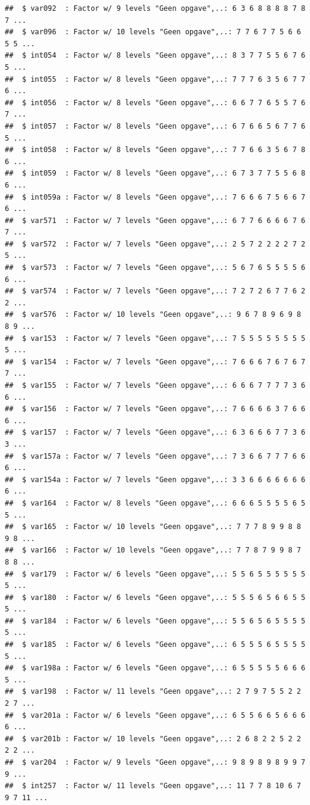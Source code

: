 \documentclass[
]{book}
\begin{document}
\begin{verbatim}
##  $ var092  : Factor w/ 9 levels "Geen opgave",..: 6 3 6 8 8 8 8 7 8 7 ...
##  $ var096  : Factor w/ 10 levels "Geen opgave",..: 7 7 6 7 7 5 6 6 5 5 ...
##  $ int054  : Factor w/ 8 levels "Geen opgave",..: 8 3 7 7 5 5 6 7 6 5 ...
##  $ int055  : Factor w/ 8 levels "Geen opgave",..: 7 7 7 6 3 5 6 7 7 6 ...
##  $ int056  : Factor w/ 8 levels "Geen opgave",..: 6 6 7 7 6 5 5 7 6 7 ...
##  $ int057  : Factor w/ 8 levels "Geen opgave",..: 6 7 6 6 5 6 7 7 6 5 ...
##  $ int058  : Factor w/ 8 levels "Geen opgave",..: 7 7 6 6 3 5 6 7 8 6 ...
##  $ int059  : Factor w/ 8 levels "Geen opgave",..: 6 7 3 7 7 5 5 6 8 6 ...
##  $ int059a : Factor w/ 8 levels "Geen opgave",..: 7 6 6 6 7 5 6 6 7 6 ...
##  $ var571  : Factor w/ 7 levels "Geen opgave",..: 6 7 7 6 6 6 6 7 6 7 ...
##  $ var572  : Factor w/ 7 levels "Geen opgave",..: 2 5 7 2 2 2 2 7 2 5 ...
##  $ var573  : Factor w/ 7 levels "Geen opgave",..: 5 6 7 6 5 5 5 5 6 6 ...
##  $ var574  : Factor w/ 7 levels "Geen opgave",..: 7 2 7 2 6 7 7 6 2 2 ...
##  $ var576  : Factor w/ 10 levels "Geen opgave",..: 9 6 7 8 9 6 9 8 8 9 ...
##  $ var153  : Factor w/ 7 levels "Geen opgave",..: 7 5 5 5 5 5 5 5 5 5 ...
##  $ var154  : Factor w/ 7 levels "Geen opgave",..: 7 6 6 6 7 6 7 6 7 7 ...
##  $ var155  : Factor w/ 7 levels "Geen opgave",..: 6 6 6 7 7 7 7 3 6 6 ...
##  $ var156  : Factor w/ 7 levels "Geen opgave",..: 7 6 6 6 6 3 7 6 6 6 ...
##  $ var157  : Factor w/ 7 levels "Geen opgave",..: 6 3 6 6 6 7 7 3 6 3 ...
##  $ var157a : Factor w/ 7 levels "Geen opgave",..: 7 3 6 6 7 7 7 6 6 6 ...
##  $ var154a : Factor w/ 7 levels "Geen opgave",..: 3 3 6 6 6 6 6 6 6 6 ...
##  $ var164  : Factor w/ 8 levels "Geen opgave",..: 6 6 6 5 5 5 5 6 5 5 ...
##  $ var165  : Factor w/ 10 levels "Geen opgave",..: 7 7 7 8 9 9 8 8 9 8 ...
##  $ var166  : Factor w/ 10 levels "Geen opgave",..: 7 7 8 7 9 9 8 7 8 8 ...
##  $ var179  : Factor w/ 6 levels "Geen opgave",..: 5 5 6 5 5 5 5 5 5 5 ...
##  $ var180  : Factor w/ 6 levels "Geen opgave",..: 5 5 5 6 5 6 6 5 5 5 ...
##  $ var184  : Factor w/ 6 levels "Geen opgave",..: 5 5 6 5 6 5 5 5 5 5 ...
##  $ var185  : Factor w/ 6 levels "Geen opgave",..: 6 5 5 5 6 5 5 5 5 5 ...
##  $ var198a : Factor w/ 6 levels "Geen opgave",..: 6 5 5 5 5 5 6 6 6 5 ...
##  $ var198  : Factor w/ 11 levels "Geen opgave",..: 2 7 9 7 5 5 2 2 2 7 ...
##  $ var201a : Factor w/ 6 levels "Geen opgave",..: 6 5 5 6 6 5 6 6 6 6 ...
##  $ var201b : Factor w/ 10 levels "Geen opgave",..: 2 6 8 2 2 5 2 2 2 2 ...
##  $ var204  : Factor w/ 9 levels "Geen opgave",..: 9 8 9 8 9 8 9 9 7 9 ...
##  $ int257  : Factor w/ 11 levels "Geen opgave",..: 11 7 7 8 10 6 7 9 7 11 ...

\end{verbatim}
\end{document}
